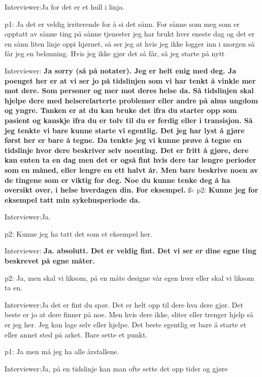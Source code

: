 \documentclass[11pt, norsk, a4paper]{article}
\begin{document}
\textcolor{myBlue} {Interviewer:}Ja for det er et hull i linja.

\textcolor{myGreen} {p1:} Ja det er veldig irriterende for å si det sånn. For sånne som meg som er opptatt av sånne ting på sånne tjenester jeg har brukt hver eneste dag og det er en sånn liten linje oppi hjørnet, så ser jeg at hvis jeg ikke logger inn i morgen så får jeg en belønning. Hvis jeg ikke gjør det så får, så jeg starte på nytt

\textcolor{myBlue} {Interviewer:} \textbf{Ja sorry (så på notater). Jeg er helt enig med deg. Ja poenget her er at vi ser jo på tidslinjen som vi har tenkt å vinkle mer mot dere. Som personer og mer mot deres helse da. Så tidslinjen skal hjelpe dere med helserelarterte problemer eller andre på ahus ungdom og yngre. Tanken er at du kan bruke det ifra du starter opp som pasient og kanskje ifra du er tolv til du er ferdig eller i transisjon. Så jeg tenkte vi bare kunne starte vi egentlig. Det jeg har lyst å gjøre først her er bare å tegne. Da tenkte jeg vi kunne prøve å tegne en tidslinje hvor dere beskriver selv noenting. Det er fritt å gjøre, dere kan enten ta en dag men det er også fint hvis dere tar lengre perioder som en måned, eller lengre en ett halvt år. Men bare beskrive noen av de tingene som er viktig for deg. Noe du kunne tenke deg å ha oversikt over, i helse hverdagen din. For eksempel.}
ß›
\textcolor{myYellow} {p2:} \textbf{Kunne jeg for eksempel tatt min sykehusperiode da.} 

\textcolor{myBlue} {Interviewer:}Ja.

\textcolor{myYellow} {p2:} Kunne jeg ha tatt det som et eksempel her.

\textcolor{myBlue} {Interviewer:} \textbf{Ja. absolutt. Det er veldig fint. Det vi ser er dine egne ting beskrevet på egne måter.} 

\textcolor{myYellow} {p2:} Ja, men skal vi liksom, på en måte designe vår egen hver eller skal vi liksom ta en.

\textcolor{myBlue} {Interviewer:}Ja det er fint du spør. Det er helt opp til dere hva dere gjør. Det beste er jo at dere finner på noe. Men hvis dere ikke, sliter eller trenger hjelp så er jeg her. Jeg kan lage selv eller hjelpe. Det beste egentlig er bare å starte et eller annet sted på arket. Bare sette et punkt.

\textcolor{myGreen} {p1:} Ja men må jeg ha alle årstallene.

\textcolor{myBlue} {Interviewer:}Ja, på en tidslinje kan man ofte sette det opp tider og gjøre 
\end{document}

